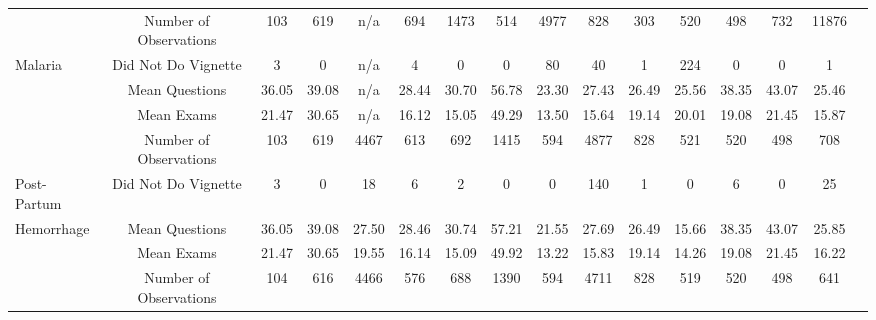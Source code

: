 \begin{tabular}{l*{15}{c}}
\hline
 &                                     {Number of Observations}&       {103}&        {619}&    {n/a}&      {694}&        {1473}&        {514}&        {4977}&        {828}&        {303}&        {520}&       {498}&       {732}&       {11876}\\
Malaria&                           {Did Not Do Vignette}&      {3}&        {0}&        {n/a}&              {4}&        {0}&            {0}&            {80}&        {40}&        {1}&        {224}&        {0}&            {0}&            {1}\\
 &                                     {Mean Questions}&                       {36.05}&        {39.08}&    {n/a}&      {28.44}&        {30.70}&        {56.78}&        {23.30}&        {27.43}&        {26.49}&        {25.56}&       {38.35}&       {43.07}&       {25.46}\\
 &                                     {Mean Exams}&                           {21.47}&        {30.65}&    {n/a}&      {16.12}&        {15.05}&        {49.29}&        {13.50}&        {15.64}&        {19.14}&        {20.01}&       {19.08}&       {21.45}&       {15.87}\\
\hline
 &                                     {Number of Observations}&       {103}&        {619}&        {4467}&        {613}&        {692}&        {1415}&        {594}&        {4877}&        {828}&        {521}&       {520}&       {498}&       {708}\\
Post-Partum&           {Did Not Do Vignette}&          {3}&        {0}&            {18}&        {6}&        {2}&        {0}&            {0}&            {140}&        {1}&        {0}&            {6}&        {0}&            {25}\\
Hemorrhage&                {Mean Questions}&                   {36.05}&        {39.08}&    {27.50}&    {28.46}&        {30.74}&        {57.21}&        {21.55}&        {27.69}&        {26.49}&        {15.66}&       {38.35}&       {43.07}&       {25.85}\\
 &                                     {Mean Exams}&                           {21.47}&        {30.65}&    {19.55}&    {16.14}&        {15.09}&        {49.92}&        {13.22}&        {15.83}&        {19.14}&        {14.26}&       {19.08}&       {21.45}&       {16.22}\\
\hline
 &                                     {Number of Observations}&       {104}&       {616}&   {4466}&   {576}&       {688}&       {1390}&       {594}&       {4711}&       {828}&       {519}&      {520}&      {498}&      {641}\\

\end{tabular}
